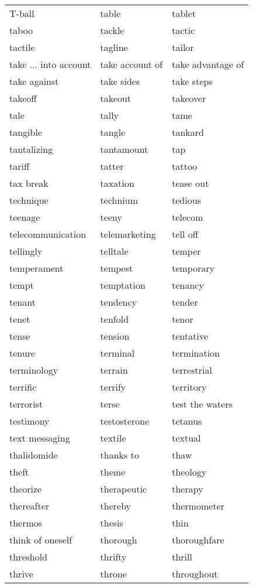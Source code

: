 \documentclass{minimal}
\begin{document}
\begin{longtable}{p{2.7cm}@{\hskip 0.2cm}p{2.7cm}@{\hskip 0.2cm}p{2.7cm}}
T-ball & table & tablet \\
taboo & tackle & tactic \\
tactile & tagline & tailor \\
take ... into account & take account of & take advantage of \\
take against & take sides & take steps \\
takeoff & takeout & takeover \\
tale & tally & tame \\
tangible & tangle & tankard \\
tantalizing & tantamount & tap \\
tariff & tatter & tattoo \\
tax break & taxation & tease out \\
technique & technium & tedious \\
teenage & teeny & telecom \\
telecommunication & telemarketing & tell off \\
tellingly & telltale & temper \\
temperament & tempest & temporary \\
tempt & temptation & tenancy \\
tenant & tendency & tender \\
tenet & tenfold & tenor \\
tense & tension & tentative \\
tenure & terminal & termination \\
terminology & terrain & terrestrial \\
terrific & terrify & territory \\
terrorist & terse & test the waters \\
testimony & testosterone & tetanus \\
text messaging & textile & textual \\
thalidomide & thanks to & thaw \\
theft & theme & theology \\
theorize & therapeutic & therapy \\
thereafter & thereby & thermometer \\
thermos & thesis & thin \\
think of oneself & thorough & thoroughfare \\
threshold & thrifty & thrill \\
thrive & throne & throughout \\

\end{longtable}
\end{document}

